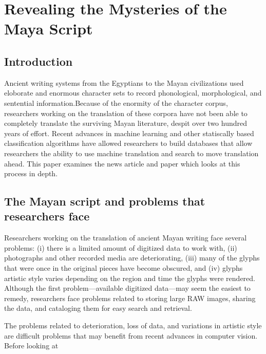 \documentclass[11pt]{article}
\author{Ryan Sharif}
\date{\today}
\title{}
\begin{document}
\tableofcontents

\section{Revealing the Mysteries of the Maya Script}
\label{sec:orgheadline9}

\subsection{Introduction}
\label{sec:orgheadline1}
Ancient writing systems from the  Egyptians to the Mayan civilizations
used  eloborate and  enormous character  sets to  record phonological,
morphological, and  sentential information.Because of the  enormity of
the character corpus, researchers working  on the translation of these
corpora have not been able to completely translate the surviving Mayan
literature,     despit      over     two     hundred      years     of
effort\cite{macri_new_2009}. Recent  advances in machine  learning and
other  statiscally   based  classification  algorithms   have  allowed
researchers to build  databases that allow researchers  the ability to
use   machine    translation   and   search   to    move   translation
ahead\cite{hu_multimedia_2015}. This  paper examines the  news article
\cite{bourquenoud_revealing_2015} and  paper \cite{hu_multimedia_2015}
which looks at this process in depth.


\subsection{The Mayan script and problems that researchers face}
\label{sec:orgheadline4}
Researchers working on  the translation of ancient  Mayan writing face
several problems: (i)  there is a limited amount of  digitized data to
work   with,   (ii)  photographs   and   other   recorded  media   are
deteriorating, (iii) many of the glyphs that were once in the original
pieces have  become obscured,  and (iv)  glyphs artistic  style varies
depending on  the region and  time the glyphs were  rendered. Although
the first problem---available digitized data---may seem the easiest to
remedy, researchers face problems related to storing large RAW images,
sharing the data, and cataloging them for easy search and retrieval.

The problems related to deterioration, loss of data, and variations in
artistic style are difficult problems that may benefit from recent
advances in computer vision. Before looking at 
\end{document}
